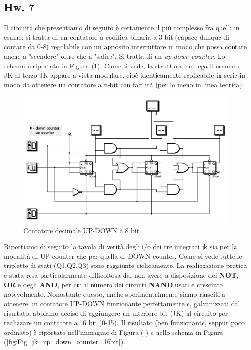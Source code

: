 \documentclass[journal, a4paper]{IEEEtran}
\begin{document}
\subsection{Hw. 7}
Il circuito che presentiamo di seguito è certamente il più complesso fra quelli in esame: si tratta di un contatore a codifica binaria a 3 bit (capace dunque di contare da 0-8) regolabile con un apposito interruttore in modo che possa contare anche a "scendere" oltre che a "salire". Si tratta di un \textit{up-down counter}. Lo schema è riportato in Figura (\ref{fig:Fig_jk_up_down_counter_8bit}). Come si vede, la struttura che lega il secondo JK al terzo JK appare a vista modulare, cioè identicamente replicabile in serie in modo da ottenere un contatore a n-bit con facilità (per lo meno in linea teorica).\\

\begin{figure}
\centering
\includegraphics[width=0.8\linewidth]{./Fig_jk_up_down_counter_8bit}
\caption{Contatore decimale UP-DOWN a 8 bit}
\label{fig:Fig_jk_up_down_counter_8bit}
\end{figure}


Riportiamo di seguito la tavola di verità degli i/o dei tre integrati jk sia per la modalità di UP-counter che per quella di DOWN-counter. Come si vede tutte le triplette di stati (Q1,Q2,Q3) sono raggiunte ciclicamente. La realizzazione pratica è stata resa particolarmente difficoltosa dal non avere a disposizione dei \textbf{NOT}, \textbf{OR} e degli \textbf{AND}, per cui il numero dei circuiti \textbf{NAND} usati è cresciuto notevolmente. Nonostante questo, anche sperimentalmente siamo riusciti a ottenere un contatore UP-DOWN funzionante perfettamente e, galvanizzati dal risultato, abbiamo deciso di aggiungere un ulteriore bit (JK) al circuito per realizzare un contatore a 16 bit (0-15). Il risultato (ben funzionante, seppur poco ordinato) è riportato nell'immagine di Figura ( ) e nello schema in Figura (\ref{fig:Fig_jk_up_down_counter_16bit}).\\
\end{document}
